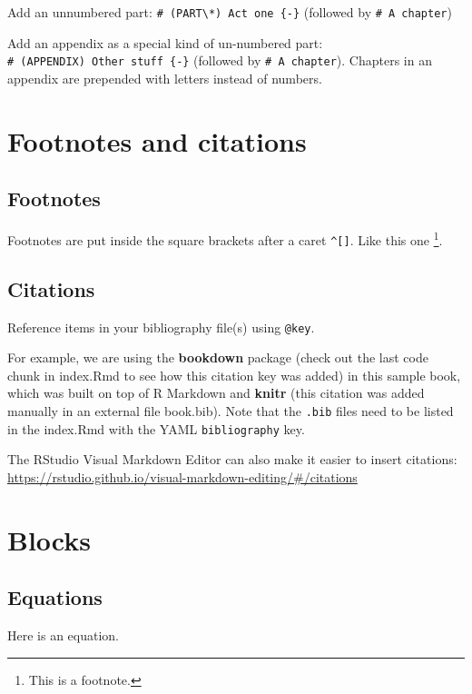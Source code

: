 \documentclass[
  12pt,
  a4paper,
]{book}
\theoremstyle{definition}
\theoremstyle{definition}
\theoremstyle{definition}
\theoremstyle{definition}
\theoremstyle{remark}
\begin{document}
Add an unnumbered part: \texttt{\#\ (PART\textbackslash{}*)\ Act\ one\ \{-\}} (followed by \texttt{\#\ A\ chapter})

Add an appendix as a special kind of un-numbered part: \texttt{\#\ (APPENDIX)\ Other\ stuff\ \{-\}} (followed by \texttt{\#\ A\ chapter}). Chapters in an appendix are prepended with letters instead of numbers.

\chapter{Footnotes and citations}\label{citations}

\section{Footnotes}\label{footnotes}

Footnotes are put inside the square brackets after a caret \texttt{\^{}{[}{]}}. Like this one \footnote{This is a footnote.}.

\section{Citations}\label{citations-1}

Reference items in your bibliography file(s) using \texttt{@key}.

For example, we are using the \textbf{bookdown} package \citep{R-bookdown} (check out the last code chunk in index.Rmd to see how this citation key was added) in this sample book, which was built on top of R Markdown and \textbf{knitr} \citep{xie2015} (this citation was added manually in an external file book.bib).
Note that the \texttt{.bib} files need to be listed in the index.Rmd with the YAML \texttt{bibliography} key.

The RStudio Visual Markdown Editor can also make it easier to insert citations: \url{https://rstudio.github.io/visual-markdown-editing/\#/citations}

\chapter{Blocks}\label{blocks}

\section{Equations}\label{equations}

Here is an equation.
\end{document}
